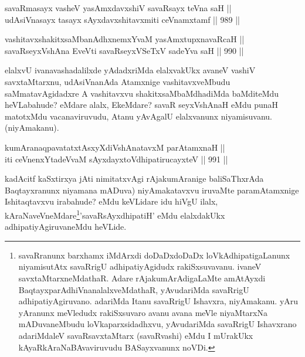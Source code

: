 
\begin{shl}
savaRmasayx vasheV yasAmxdavxshiV savaRsayx teVna saH || \\
udAsiVnasayx tasayx sAyxdavxshitavxmiti ceVnamxtamf \hfill || 989 ||  
\end{shl}

\begin{shl}
vashitavxshakitxsaMbanAdhxnemxYvaM yasAmxtupxnavaRcaH || \\
savaRseyxVshAna EveVti savaRseyxVSeTxV sadeYva saH \hfill || 990 ||  
\end{shl}

\begin{artha}
elalxvU ivanavashadalilxde yAdadxriMda elalxvakUkx avaneV vashiV savxtaMtarxnu, udAsiVnanAda Atamxnige vashitavxveMbudu saMmatavAgidadxre A vashitavxvu shakitxsaMbaMdhadiMda baMditeMdu heVLabahude? eMdare alalx, EkeMdare? savaR seyxVshAnaH eMdu punaH matotxMdu vacanaviruvudu, Atanu yAvAgalU elalxvanunx niyamisuvanu. (niyAmakanu).
\end{artha}


\begin{shl}
kumAranaqpavatatxtAsxyXdiVshAnatavxM parAtamxnaH ||  \\
iti ceVnenxYtadeVvaM sAyxdayxtoV\s dhipatirucayxteV \hfill || 991 ||  
\end{shl}

\begin{artha}
kadAcitf kaSxtirxya jAti nimitatxvAgi rAjakumAranige baliSaThxrAda Baqtayxranunx niyamana mADuva) niyAmakatavxvu iruvaMte paramAtamxnige Ishitaqtavxvu irabahude? eMdu keVLidare idu hiVgU ilalx, kAraNaveVneMdare\ndash \footnote{savaRranunx barxhamx iMdArxdi doDaDxdoDaDx loVkAdhipatigaLanunx niyamisutAtx savaRrigU adhipatiyAgidudx rakiSxsuvavanu. ivaneV savxtaMtarxneMdathaR. Adare rAjakumArAdigaLaMte amAtAyxdi BaqtayxparAdhiVnanalalxveMdathaR, yAvudariMda savaRrigU adhipatiyAgiruvano. adariMda Itanu savaRrigU Ishavxra, niyAmakanu. yAru yAranunx meVledudx rakiSxsuvaro avanu avana meVle niyaMtarxNa mADuvaneMbudu loVkaparxsidadhxvu, yAvudariMda savaRrigU Ishavxrano adariMdaleV savaRsavxtaMtarx (savaRvashi) eMdu I mUrakUkx kAyaRkAraNaBAvaviruvudu BASayxvanunx noVDi.}'savaRsAyxdhipatiH' eMdu elalxdakUkx adhipatiyAgiruvaneMdu heVLide.
\end{artha}

